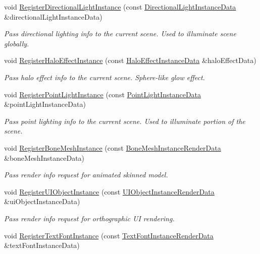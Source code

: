 \begin{DoxyCompactItemize}
void \hyperlink{classAppRenderer_ab12a770688fb1d142c6701acebfdd6b4}{Register\+Directional\+Light\+Instance} (const \hyperlink{structDirectionalLightInstanceData}{Directional\+Light\+Instance\+Data} \&directional\+Light\+Instance\+Data)
\begin{DoxyCompactList}\small\item\em Pass directional lighting info to the current scene. Used to illuminate scene globally. \end{DoxyCompactList}\item 
void \hyperlink{classAppRenderer_a8dcf762bbcbdce2de5e3f0a8810ab5dc}{Register\+Halo\+Effect\+Instance} (const \hyperlink{structHaloEffectInstanceData}{Halo\+Effect\+Instance\+Data} \&halo\+Effect\+Data)
\begin{DoxyCompactList}\small\item\em Pass halo effect info to the current scene. Sphere-\/like glow effect. \end{DoxyCompactList}\item 
void \hyperlink{classAppRenderer_a214f01562badba6e4f10038a239917f8}{Register\+Point\+Light\+Instance} (const \hyperlink{structPointLightInstanceData}{Point\+Light\+Instance\+Data} \&point\+Light\+Instance\+Data)
\begin{DoxyCompactList}\small\item\em Pass point lighting info to the current scene. Used to illuminate portion of the scene. \end{DoxyCompactList}\item 
void \hyperlink{classAppRenderer_a28300e8e65298f09dff5d469dea3f85c}{Register\+Bone\+Mesh\+Instance} (const \hyperlink{structBoneMeshInstanceRenderData}{Bone\+Mesh\+Instance\+Render\+Data} \&bone\+Mesh\+Instance\+Data)
\begin{DoxyCompactList}\small\item\em Pass render info request for animated skinned model. \end{DoxyCompactList}\item 
void \hyperlink{classAppRenderer_ac80c3259382af5a0bd7163132da9c718}{Register\+U\+I\+Object\+Instance} (const \hyperlink{structUIObjectInstanceRenderData}{U\+I\+Object\+Instance\+Render\+Data} \&ui\+Object\+Instance\+Data)
\begin{DoxyCompactList}\small\item\em Pass render info request for orthographic UI rendering. \end{DoxyCompactList}\item 
void \hyperlink{classAppRenderer_aaca975e8c6b1ac11095591926d942e4c}{Register\+Text\+Font\+Instance} (const \hyperlink{structTextFontInstanceRenderData}{Text\+Font\+Instance\+Render\+Data} \&text\+Font\+Instance\+Data)

\end{DoxyCompactItemize}
